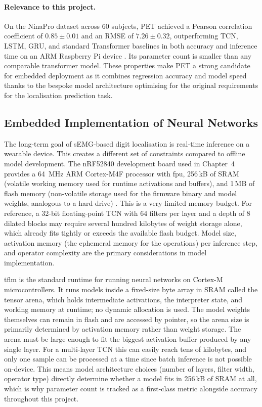 \documentclass[11pt]{article}
\begin{document}
\paragraph{Relevance to this project.}
On the NinaPro dataset across 60 subjects, PET achieved a Pearson correlation coefficient of $0.85 \pm 0.01$ and an RMSE of $7.26 \pm 0.32$, outperforming TCN, LSTM, GRU, and standard Transformer baselines in both accuracy and inference time on an ARM Raspberry Pi device \cite{lin2025pet}. Its parameter count is smaller than any comparable transformer model. These properties make PET a strong candidate for embedded deployment as it combines regression accuracy and model speed thanks to the bespoke model architecture optimising for the original requirements for the localisation prediction task.

\subsection{Embedded Implementation of Neural Networks}
\label{sec:embedded_lit}
The long-term goal of sEMG-based digit localisation is real-time inference on a wearable device. This creates a different set of constraints compared to offline model development. The nRF52840 development board used in Chapter~4 provides a 64~MHz ARM Cortex-M4F processor with \gls{fpu}, 256\,kB of SRAM (volatile working memory used for runtime activations and buffers), and 1\,MB of flash memory (non-volatile storage used for the firmware binary and model weights, analogous to a hard drive) \cite{nrf52840spec}. This is a very limited memory budget. For reference, a 32-bit floating-point TCN with 64 filters per layer and a depth of 8 dilated blocks may require several hundred kilobytes of weight storage alone, which already fits tightly or exceeds the available flash budget. Model size, activation memory (the ephemeral memory for the operations) per inference step, and operator complexity are the primary considerations in model implementation.

\Gls{tflm} is the standard runtime for running neural networks on Cortex-M microcontrollers. It runs models inside a fixed-size byte array in SRAM called the tensor arena, which holds intermediate activations, the interpreter state, and working memory at runtime; no dynamic allocation is used. The model weights themselves can remain in flash and are accessed by pointer, so the arena size is primarily determined by activation memory rather than weight storage. The arena must be large enough to fit the biggest activation buffer produced by any single layer. For a multi-layer TCN this can easily reach tens of kilobytes, and only one sample can be processed at a time since batch inference is not possible on-device. This means model architecture choices (number of layers, filter width, operator type) directly determine whether a model fits in 256\,kB of SRAM at all, which is why parameter count is tracked as a first-class metric alongside accuracy throughout this project.
\end{document}
